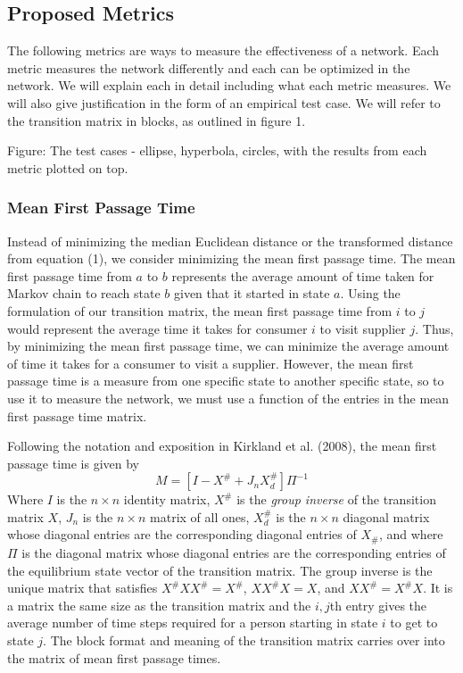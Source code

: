 \documentclass[twoside,twocolumn]{article}
\begin{document}
\subsection{Proposed Metrics}
The following metrics are ways to measure the effectiveness of a network.
Each metric measures the network differently and each can be optimized in the network.
We will explain each in detail including what each metric measures.
We will also give justification in the form of an empirical test case. %
We will refer to the transition matrix in blocks, as outlined in figure 1.%


Figure: The test cases - ellipse, hyperbola, circles, with the results from each metric plotted on top.


\subsubsection{Mean First Passage Time}
Instead of minimizing the median Euclidean distance or the transformed distance from equation (1), we consider minimizing the mean first passage time.
The mean first passage time from $a$ to $b$ represents the average amount of time taken for Markov chain to reach state $b$ given that it started in state $a$.
Using the formulation of our transition matrix, the mean first passage time from $i$ to $j$ would represent the average time it takes for consumer $i$ to visit supplier $j$.
Thus, by minimizing the mean first passage time, we can minimize the average amount of time it takes for a consumer to visit a supplier.
However, the mean first passage time is a measure from one specific state to another specific state, so to use it to measure the network, we must use a function of the entries in the mean first passage time matrix.

Following the notation and exposition in Kirkland et al. (2008), the mean first passage time is given by
$$ M = [I - X^{\#} + J_{n}X_{d}^{\#}]\Pi^{-1}$$
Where $I$ is the $n \times n$ identity matrix, $X^{\#}$ is the {\em group inverse} of the transition matrix $X$, $J_{n}$ is the $n \times n$ matrix of all ones, $X_{d}^{\#}$ is the $n \times n$ diagonal matrix whose diagonal entries are the corresponding diagonal entries of $X_{\#}$, and where $\Pi$ is the diagonal matrix whose diagonal entries are the corresponding entries of the equilibrium state vector of the transition matrix.%
The group inverse is the unique matrix that satisfies $X^{\#}XX^{\#} = X^{\#}$, $XX^{\#}X = X$, and $XX^{\#} = X^{\#}X$.
It is a matrix the same size as the transition matrix and the $i,j$th entry gives the average number of time steps required for a person starting in state $i$ to get to state $j$.
The block format and meaning of the transition matrix carries over into the matrix of mean first passage times.
\end{document}
